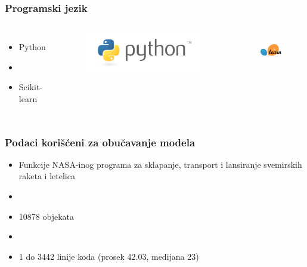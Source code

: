 \documentclass[14pt]{beamer}
\begin{document}
%
%
%


\begin{frame}
\frametitle{Programski jezik}

\begin{columns}[c]

\begin{itemize}
\item Python
\item[]
\item Scikit-learn
\end{itemize}

\begin{figure}
\includegraphics[width=0.6\linewidth]{python}
\end{figure}

\begin{figure}
\includegraphics[width=0.6\linewidth, height=1.5cm]{sklearn}
\end{figure}

\end{columns}

\end{frame}

\begin{frame}
\frametitle{Podaci korišćeni za obučavanje modela}

\begin{itemize}
\item Funkcije NASA-inog programa za sklapanje, transport i lansiranje svemirskih raketa i letelica
\item[]
\item 10878 objekata
\item[]
\item 1 do 3442 linije koda (prosek 42.03, medijana 23)
\end{itemize}

\end{frame}
\end{document}
